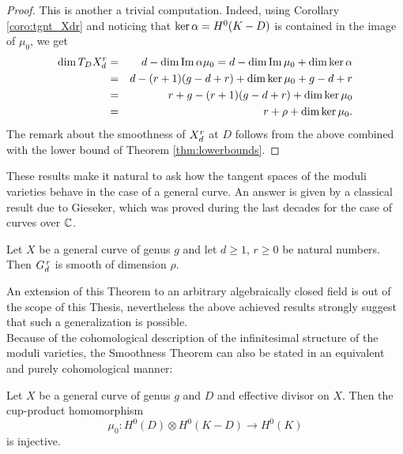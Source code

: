 	\begin{proof}
		This is another a trivial computation. Indeed, using Corollary \ref{coro:tgnt_Xdr} and noticing that $\ker\alpha=H^0(K-D)$ is contained in the image of $\mu_0$, we get
			\begin{eqnarray*}
				\dim T_D X_d^r 
				&=& d - \dim\operatorname{Im}\alpha\mu_0 = d - \dim\operatorname{Im}\mu_0 + \dim\ker\alpha \\
				&=& d - (r+1)(g-d+r) + \dim\ker\mu_0  + g-d+r \\
				&=& r + g - (r+1)(g-d+r) + \dim\ker\mu_0 \\ 
				&=& r + \rho + \dim\ker\mu_0.
			\end{eqnarray*}
			The remark about the smoothness of $X_d^r$ at $D$ follows from the above combined with the lower bound of Theorem \ref{thm:lowerbounds}.
	\end{proof}

	These results make it natural to ask how the tangent spaces of the moduli varieties behave in the case of a general curve. An answer is given by a classical result due to Gieseker, which was proved during the last decades for the case of curves over $\mathbb{C}$. 
	\begin{namedtheo}
		Let $X$ be a general curve of genus $g$ and let $d\geq 1$, $r\geq 0$ be natural numbers. Then $G_d^{\,r}$ is smooth of dimension $\rho$.
	\end{namedtheo} 
	An extension of this Theorem to an arbitrary algebraically closed field is out of the scope of this Thesis, nevertheless the above achieved results strongly suggest that such a generalization is possible.\\
	Because of the cohomological description of the infinitesimal structure of the moduli varieties, the Smoothness Theorem can also be stated in an equivalent and purely cohomological manner:
	\begin{namedtheo}
		Let $X$ be a general curve of genus $g$ and $D$ and effective divisor on $X$. Then the cup-product homomorphism
		$$ \mu_{0} : H^0(D)\otimes H^0(K-D) \to H^0(K) $$
		is injective.
	\end{namedtheo}

	






